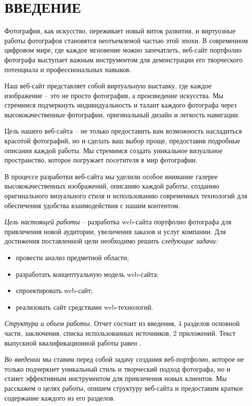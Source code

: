 \section*{ВВЕДЕНИЕ}
Фотография, как искусство, переживает новый виток развития, и виртуозные работы фотографов становятся неотъемлемой частью этой эпохи. В современном цифровом мире, где каждое мгновение можно запечатлеть, веб-сайт портфолио фотографа выступает важным инструментом для демонстрации его творческого потенциала и профессиональных навыков.

Наш веб-сайт представляет собой виртуальную выставку, где каждое изображение – это не просто фотография, а произведение искусства. Мы стремимся подчеркнуть индивидуальность и талант каждого фотографа через высококачественные фотографии, оригинальный дизайн и легкость навигации.

Цель нашего веб-сайта – не только предоставить вам возможность насладиться красотой фотографий, но и сделать ваш выбор проще, предоставив подробные описания каждой работы. Мы стремимся создать уникальное визуальное пространство, которое погружает посетителя в мир фотографии.

В процессе разработки веб-сайта мы уделили особое внимание галерее высококачественных изображений, описанию каждой работы, созданию оригинального визуального стиля и использованию современных технологий для обеспечения удобства взаимодействия с нашим контентом.

\emph{Цель настоящей работы} – разработка web-сайта портфолио фотографа для привлечения новой аудитории, увеличения заказов и услуг компании. Для достижения поставленной цели необходимо решить \emph{следующие задачи:}
\begin{itemize}
\item провести анализ предметной области;
\item разработать концептуальную модель web-сайта;
\item спроектировать web-сайт;
\item реализовать сайт средствами web-технологий.
\end{itemize}

\emph{Структура и объем работы.} Отчет состоит из введения, 4 разделов основной части, заключения, списка использованных источников, 2 приложений. Текст выпускной квалификационной работы равен .


\emph{Во введении} мы ставим перед собой задачу создания веб-портфолио, которое не только подчеркнет уникальный стиль и творческий подход фотографа, но и станет эффективным инструментом для привлечения новых клиентов. Мы расскажем о целях работы, опишем структуру веб-сайта и предоставим краткое содержание каждого из его разделов.


